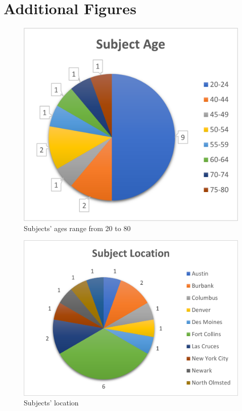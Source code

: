 \documentclass[english]{vgtc}
\begin{document}
\appendix
\section{Additional Figures}

\begin{figure}[!htb]
  \centering
  \includegraphics[width=0.95\columnwidth]{subject-age.png}
  \caption{Subjects' ages range from 20 to 80}
  \label{fig:age}
\end{figure}

\begin{figure}[htb]
  \centering
  \includegraphics[width=0.95\columnwidth]{subject-location.png}
  \caption{Subjects' location}
  \label{fig:location}
\end{figure}



\end{document}
